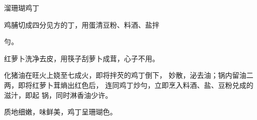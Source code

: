 \begin{recipe}{溜珊瑚鸡丁}

\ingredients


\cooking

\step 	鸡脯切成四分见方的丁，用蛋清豆粉、料酒、盐拌

勻。

\step 	红萝卜洗净去皮，用筷子刮萝卜成茸，心子不用。

\step 	化猪油在旺火上娆至七成火，即将拌芡的鸡丁倒下， 妙散，泌去油；锅内留油二两，即将红萝卜茸熵出红色后， 连同鸡丁炒勻，立即烹入料酒、盐、豆粉兑成的滋汁，即起 锅，同时淋香油少许。

\notes

质地细嫩，味鲜美，鸡丁呈珊瑚色。

\end{recipe}

